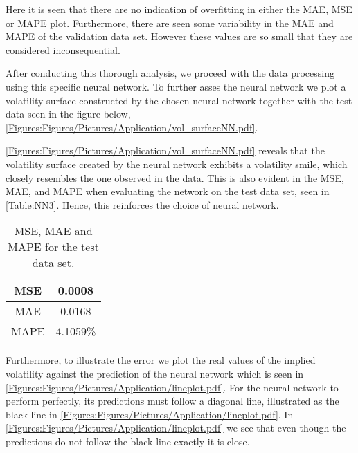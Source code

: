 Here it is seen that there are no indication of overfitting in either the MAE, MSE or MAPE plot. Furthermore, there are seen some variability in the MAE and MAPE of the validation data set. However these values are so small that they are considered inconsequential. 

After conducting this thorough analysis, we proceed with the data processing using this specific neural network. To further asses the neural network we plot a volatility surface constructed by the chosen neural network together with the test data seen in the figure below, \autoref{Figures:Figures/Pictures/Application/vol_surfaceNN.pdf}. 

\autoref{Figures:Figures/Pictures/Application/vol_surfaceNN.pdf} reveals that the volatility surface created by the neural network exhibits a volatility smile, which closely resembles the one observed in the data. This is also evident in the MSE, MAE, and MAPE when evaluating the network on the test data set, seen in \autoref{Table:NN3}. Hence, this reinforces the choice of neural network.
\begin{table}[H]
    \centering
    {\renewcommand{\arraystretch}{1.25}\begin{tabular}{c|c}
        MSE   &  0.0008\\ \hline
        MAE  &  0.0168\\ \hline
        MAPE &  4.1059\%\\ 
    \end{tabular}}
    \caption{MSE, MAE and MAPE for the test data set.}
    \label{Table:NN3}
\end{table}

Furthermore, to illustrate the error we plot the real values of the implied volatility against the prediction of the neural network which is seen in \autoref{Figures:Figures/Pictures/Application/lineplot.pdf}. For the neural network to perform perfectly, its predictions must follow a diagonal line, illustrated as the black line in \autoref{Figures:Figures/Pictures/Application/lineplot.pdf}. In \autoref{Figures:Figures/Pictures/Application/lineplot.pdf} we see that even though the predictions do not follow the black line exactly it is close.


